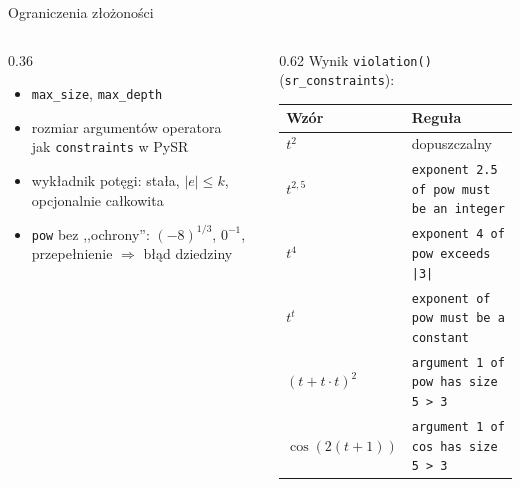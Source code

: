 \documentclass[aspectratio=169,11pt]{beamer}
\begin{document}
\begin{frame}{Ograniczenia złożoności}
  \begin{columns}[T]
    \begin{column}{0.36\textwidth}
      \begin{itemize}\small
        \item \texttt{max\_size}, \texttt{max\_depth}
        \item rozmiar argumentów operatora\\
          {\footnotesize\color{muted}jak \texttt{constraints} w PySR}
        \item wykładnik potęgi: stała, $|e| \le k$, opcjonalnie całkowita
        \item \texttt{pow} bez ,,ochrony'': $(-8)^{1/3}$, $0^{-1}$, przepełnienie $\Rightarrow$ błąd dziedziny
      \end{itemize}
    \end{column}
    \begin{column}{0.62\textwidth}
      {\small Wynik \texttt{violation()} (\texttt{sr\_constraints}):}\par\smallskip
      \scriptsize
      \begin{tabular}{@{}l l@{}}
        \toprule
        Wzór & Reguła \\ \midrule
        $t^{2}$ & dopuszczalny \\
        $t^{2{,}5}$ & \texttt{exponent 2.5 of pow must be an integer} \\
        $t^{4}$ & \texttt{exponent 4 of pow exceeds |3|} \\
        $t^{t}$ & \texttt{exponent of pow must be a constant} \\
        $(t + t\cdot t)^2$ & \texttt{argument 1 of pow has size 5 > 3} \\
        $\cos(2(t+1))$ & \texttt{argument 1 of cos has size 5 > 3} \\
        \bottomrule
      \end{tabular}
    \end{column}
  \end{columns}
\end{frame}
\end{document}
